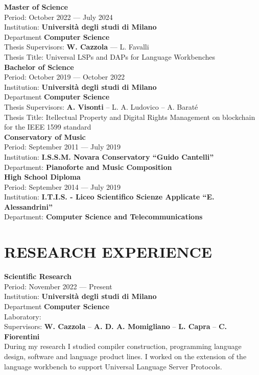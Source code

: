 \documentclass[a4paper,9pt]{extarticle}
\begin{document}
\noindent
\newline
\textbf{Master of Science} \\
Period: October 2022 --- July 2024 \\
Institution: \textbf{Universit\`a degli studi di Milano} \\
Department \textbf{Computer Science} \\
Thesis Supervisors: \textbf{W. Cazzola} --- L. Favalli \\
Thesis Title: Universal LSPs and DAPs for Language Workbenches \\

\noindent
\textbf{Bachelor of Science} \\
Period: October 2019 --- October 2022 \\
Institution: \textbf{Universit\`a degli studi di Milano} \\
Department \textbf{Computer Science} \\
Thesis Supervisors: \textbf{A. Visonti} -- L. A. Ludovico -- A. Barat\'e \\
Thesis Title: Itellectual Property and Digital Rights Management on blockchain for the IEEE 1599 standard \\

\noindent
\textbf{Conservatory of Music} \\
Period: September 2011 --- July 2019 \\
Institution: \textbf{I.S.S.M. Novara Conservatory ``Guido Cantelli''} \\
Department: \textbf{Pianoforte and Music Composition} \\


\noindent
\textbf{High School Diploma} \\
Period: September 2014 --- July 2019 \\
Institution: \textbf{I.T.I.S. - Liceo Scientifico Scienze Applicate ``E. Alessandrini''} \\
Department: \textbf{Computer Science and Telecommunications} \\


\section*{RESEARCH EXPERIENCE}

\noindent
\newline
\textbf{Scientific Research} \\
Period: November 2022 --- Present \\
Institution: \textbf{Universit\`a degli studi di Milano} \\
Department \textbf{Computer Science} \\
Laboratory: \textbf{\adaptlab} \\
Supervisors: \textbf{W. Cazzola} -- \textbf{A. D. A. Momigliano} -- \textbf{L. Capra} -- \textbf{C. Fiorentini} \\
During my research I studied compiler construction, programming language design, software and language product lines. I worked on the extension of the \neverlang language workbench to support Universal Language Server Protocols. \\
\end{document}
